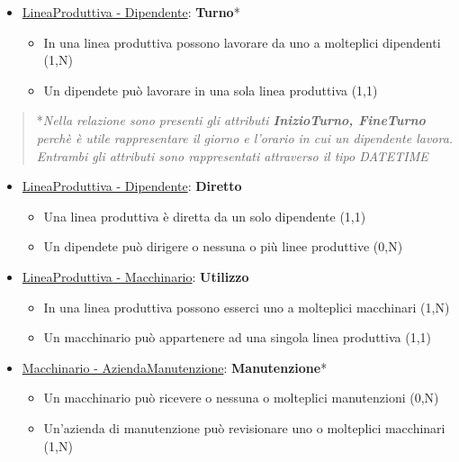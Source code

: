 \begin{itemize}
	\item \underline{LineaProduttiva - Dipendente}: \textbf{Turno}*
	
	\begin{itemize}
		\item In una linea produttiva possono lavorare da uno a molteplici dipendenti (1,N)
		\item Un dipendete può lavorare in una sola linea produttiva (1,1)
	\end{itemize}
	
\end{itemize}

\begin{verse}
	*\emph{Nella relazione sono presenti gli attributi \textbf{InizioTurno, FineTurno} perchè è utile rappresentare il giorno e l'orario in cui un dipendente lavora. Entrambi gli attributi sono rappresentati attraverso il tipo DATETIME}
\end{verse}

\begin{itemize}
	\item \underline{LineaProduttiva - Dipendente}: \textbf{Diretto}
	
	\begin{itemize}
		\item Una linea produttiva è diretta da un solo dipendente (1,1)
		\item Un dipendete può dirigere o nessuna o più linee produttive (0,N)
	\end{itemize}
	
\end{itemize}

\begin{itemize}
	\item \underline{LineaProduttiva - Macchinario}: \textbf{Utilizzo}
	
	\begin{itemize}
		\item In una linea produttiva possono esserci uno a molteplici macchinari (1,N)
		\item Un macchinario può appartenere ad una singola linea produttiva (1,1)
	\end{itemize}
	
\end{itemize}

\begin{itemize}
	\item \underline{Macchinario - AziendaManutenzione}: \textbf{Manutenzione}*
	
	\begin{itemize}
		\item Un macchinario può ricevere o nessuna o molteplici manutenzioni (0,N)
		\item Un'azienda di manutenzione può revisionare uno o molteplici macchinari (1,N)
	\end{itemize}
	
\end{itemize}


